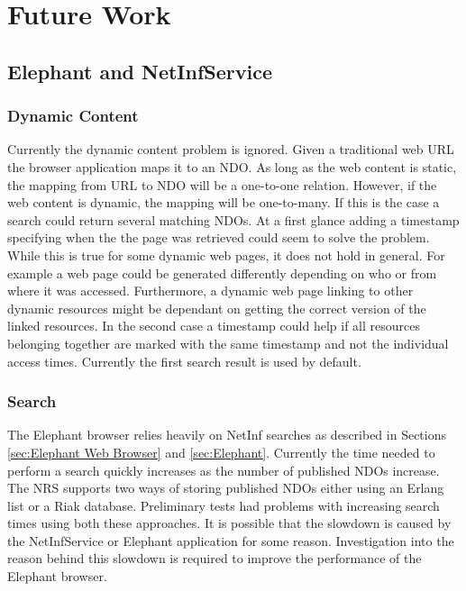 \section{Future Work}

\subsection{Elephant and NetInfService}

\subsubsection{Dynamic Content}

Currently the dynamic content problem is ignored. Given a traditional web URL the browser application maps it to an NDO. As long as the web content is static, the mapping from URL to NDO will be a one-to-one relation. However, if the web content is dynamic, the mapping will be one-to-many. If this is the case a search could return several matching NDOs. At a first glance adding a timestamp specifying when the the page was retrieved could seem to solve the problem. While this is true for some dynamic web pages, it does not hold in general. For example a web page could be generated differently depending on who or from where it was accessed. Furthermore, a dynamic web page linking to other dynamic resources might be dependant on getting the correct version of the linked resources. In the second case a timestamp could help if all resources belonging together are marked with the same timestamp and not the individual access times. Currently the first search result is used by default.

\subsubsection{Search}

The Elephant browser relies heavily on NetInf searches as described in Sections \ref{sec:Elephant Web Browser} and \ref{sec:Elephant}. Currently the time needed to perform a search quickly increases as the number of published NDOs increase. The NRS supports two ways of storing published NDOs either using an Erlang list or a Riak database. Preliminary tests had problems with increasing search times using both these approaches. It is possible that the slowdown is caused by the NetInfService or Elephant application for some reason. Investigation into the reason behind this slowdown is required to improve the performance of the Elephant browser.

